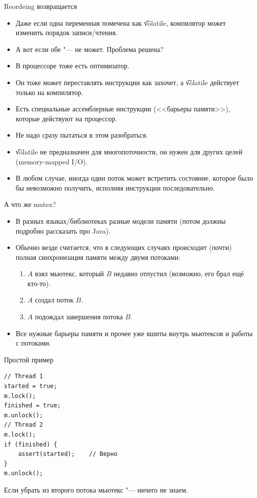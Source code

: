 \begin{frame}{Reordeing возвращается}
	\begin{itemize}
		\item Даже если одна переменная помечена как \t{volatile}, компилятор может изменить порядок записи/чтения.
		\item А вот если обе "--- не может. Проблема решена? \pause
		\item В процессоре тоже есть оптимизатор.
		\item Он тоже может переставлять инструкции как захочет, а \t{volatile} действует только на компилятор.
		\item Есть специальные ассемблерные инструкции (<<барьеры памяти>>), которые действуют на процессор.
		\item Не надо сразу пытаться в этом разобраться.
		\item \t{volatile} не предназначен для многопоточности, он нужен для других целей (memory-mapped I/O).
		\item В любом случае, иногда один поток может встретить состояние, которое было бы невозможно получить, исполняя инструкции последовательно.
	\end{itemize}
\end{frame}

\begin{frame}{А что же mutex?}
	\begin{itemize}
		\item В разных языках/библиотеках разные модели памяти (потом должны подробно рассказать про Java).
		\item Обычно везде считается, что в следующих случаях происходит (почти) полная синхронизация памяти между двумя потоками:
			\begin{enumerate}
				\item $A$ взял мьютекс, который $B$ недавно отпустил (возможно, его брал ещё кто-то).
				\item $A$ создал поток $B$.
				\item $A$ подождал завершения потока $B$.
			\end{enumerate}
		\item Все нужные барьеры памяти и прочее уже вшиты внутрь мьютексов и работы с потоками.
	\end{itemize}
\end{frame}

\begin{frame}[fragile]{Простой пример}
\begin{verbatim}
// Thread 1
started = true;
m.lock();
finished = true;
m.unlock();
// Thread 2
m.lock();
if (finished) {
    assert(started);    // Верно
}
m.unlock();
\end{verbatim}
	Если убрать из второго потока мьютекс "--- ничего не знаем.
\end{frame}

